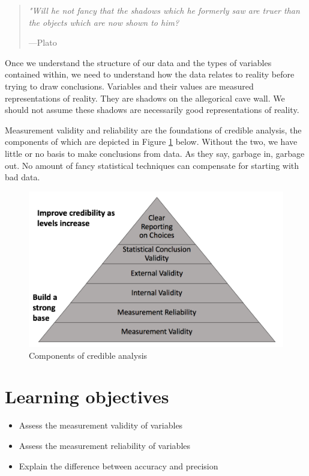 \documentclass[
]{book}
\providecommand{\tightlist}{%
  \setlength{\itemsep}{0pt}\setlength{\parskip}{0pt}}
\begin{document}
\begin{quote}
\emph{"Will he not fancy that the shadows which he formerly saw are truer than the objects which are now shown to him?}

---Plato
\end{quote}

Once we understand the structure of our data and the types of variables contained within, we need to understand how the data relates to reality before trying to draw conclusions. Variables and their values are measured representations of reality. They are shadows on the allegorical cave wall. We should not assume these shadows are necessarily good representations of reality.

Measurement validity and reliability are the foundations of credible analysis, the components of which are depicted in Figure \ref{fig:credfig} below. Without the two, we have little or no basis to make conclusions from data. As they say, garbage in, garbage out. No amount of fancy statistical techniques can compensate for starting with bad data.

\begin{figure}

{\centering \includegraphics[width=\textwidth]{images/credible} 

}

\caption{Components of credible analysis}\label{fig:credfig}
\end{figure}

\hypertarget{lo3}{%
\section{Learning objectives}\label{lo3}}

\begin{itemize}
\tightlist
\item
  Assess the measurement validity of variables
\item
  Assess the measurement reliability of variables
\item
  Explain the difference between accuracy and precision
\end{itemize}
\end{document}
